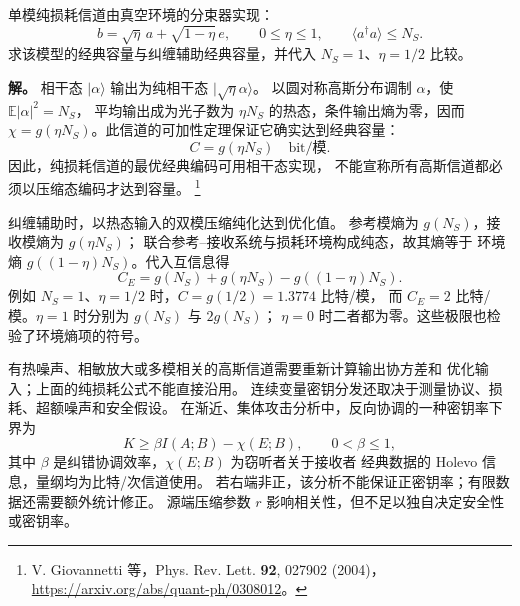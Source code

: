 \begin{example}[纯损耗信道的两种容量]
单模纯损耗信道由真空环境的分束器实现：
\[
b=\sqrt\eta\,a+\sqrt{1-\eta}\,e,\qquad
0\le\eta\le1,\qquad \langle a^\dagger a\rangle\le N_S.
\]
求该模型的经典容量与纠缠辅助经典容量，并代入 $N_S=1$、$\eta=1/2$ 比较。

\textbf{解。} 相干态 $|\alpha\rangle$ 输出为纯相干态 $|\sqrt\eta\alpha\rangle$。
以圆对称高斯分布调制 $\alpha$，使 $\mathbb E|\alpha|^2=N_S$，
平均输出成为光子数为 $\eta N_S$ 的热态，条件输出熵为零，因而
$\chi=g(\eta N_S)$。此信道的可加性定理保证它确实达到经典容量：
\[
C=g(\eta N_S)\quad\text{bit/模}.
\]
因此，纯损耗信道的最优经典编码可用相干态实现，
不能宣称所有高斯信道都必须以压缩态编码才达到容量。
\footnote{V. Giovannetti 等，Phys. Rev. Lett. \textbf{92}, 027902 (2004)，
\url{https://arxiv.org/abs/quant-ph/0308012}。}

纠缠辅助时，以热态输入的双模压缩纯化达到优化值。
参考模熵为 $g(N_S)$，接收模熵为 $g(\eta N_S)$；
联合参考--接收系统与损耗环境构成纯态，故其熵等于
环境熵 $g((1-\eta)N_S)$。代入互信息得
\[
C_E=g(N_S)+g(\eta N_S)-g((1-\eta)N_S).
\]
例如 $N_S=1$、$\eta=1/2$ 时，$C=g(1/2)=1.3774$ 比特/模，
而 $C_E=2$ 比特/模。$\eta=1$ 时分别为 $g(N_S)$ 与 $2g(N_S)$；
$\eta=0$ 时二者都为零。这些极限也检验了环境熵项的符号。
\end{example}

\begin{note}[容量与密钥率的条件]
有热噪声、相敏放大或多模相关的高斯信道需要重新计算输出协方差和
优化输入；上面的纯损耗公式不能直接沿用。
连续变量密钥分发还取决于测量协议、损耗、超额噪声和安全假设。
在渐近、集体攻击分析中，反向协调的一种密钥率下界为
\[
K\ge\beta I(A;B)-\chi(E;B),\qquad 0<\beta\le1,
\]
其中 $\beta$ 是纠错协调效率，$\chi(E;B)$ 为窃听者关于接收者
经典数据的 Holevo 信息，量纲均为比特/次信道使用。
若右端非正，该分析不能保证正密钥率；有限数据还需要额外统计修正。
源端压缩参数 $r$ 影响相关性，但不足以独自决定安全性或密钥率。
\end{note}
